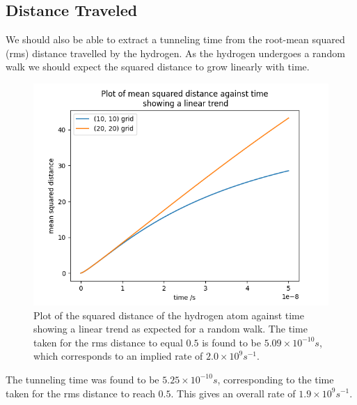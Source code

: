 \subsection{Distance Traveled}
We should also be able to
extract a tunneling time from
the root-mean squared (rms)
distance travelled by the
hydrogen. As the hydrogen
undergoes a random walk we should
expect the squared distance to
grow linearly with time.
\begin{figure}
    \centering
    \includegraphics[width=0.5\linewidth]{Figures/Redfield/Plot of lindblad solution squared distance.png}
    \caption{Plot of the squared distance
    of the hydrogen atom against time
    showing a linear trend as expected
    for a random walk. The time taken
    for the rms distance to equal \(0.5\)
    is found to be
    \(5.09\times{}10^{-10}s\),
    which corresponds to an implied rate
    of \(2.0 \times 10^{9}s^{-1}\).
    }
\end{figure}
The tunneling time was
found to be \(5.25\times{}10^{-10}s\),
corresponding to the time taken
for the rms distance to
reach \(0.5\). This gives
an overall rate of
\(1.9 \times 10^{9}s^{-1}\).


